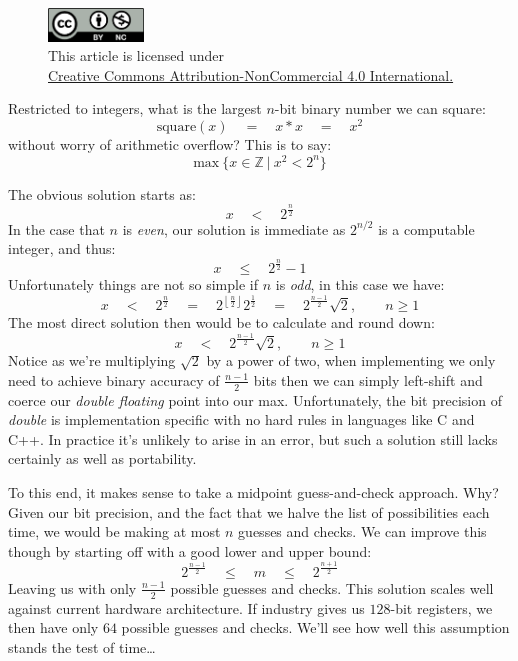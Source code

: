 \documentclass[twoside]{article}
\newcommand{\eq}{\ensuremath{\quad = \quad}}
\newcommand{\lt}{\ensuremath{\quad < \quad}}
\renewcommand{\leq}{\ensuremath{\quad\le\quad}}
\begin{document}
\begin{figure}[h]
\centering
\includegraphics[width=1in]{../../../cc-by-nc.png}\\[0.1in]
\tiny This article is licensed under \\
\href{http://creativecommons.org/licenses/by-nc/4.0/}
{Creative Commons Attribution-NonCommercial 4.0 International.}\\[0.3in]
\end{figure}

Restricted to integers, what is the largest $ n $-bit binary number we can square:
$$ \mbox{square}(x)\quad =\quad x*x\quad =\quad x^2 $$
without worry of arithmetic overflow? This is to say:
$$ \mbox{max}\ \{ x\in\mathbb{Z}\ |\ x^2 < 2^n \} $$

The obvious solution starts as:
$$ x \lt 2^{\frac{n}{2}} $$
In the case that $ n $ is \emph{even}, our solution is immediate as $ 2^{n/2} $ is a computable integer, and thus:
$$ x \leq 2^{\frac{n}{2}}-1 $$
Unfortunately things are not so simple if $ n $ is \emph{odd}, in this case we have:
$$ x\lt 2^\frac{n}{2} \eq 2^{\left\lfloor\frac{n}{2}\right\rfloor}2^\frac{1}{2} \eq 2^\frac{n-1}{2}\sqrt{2},\qquad n\ge 1 $$
The most direct solution then would be to calculate and round down:
$$ x\lt 2^\frac{n-1}{2}\sqrt{2},\qquad n\ge 1 $$
Notice as we're multiplying $ \sqrt{2} $ by a power of two, when implementing we only need to achieve binary accuracy
of $ \frac{n-1}{2} $ bits then we can simply left-shift and coerce our \emph{double floating} point into our max.
Unfortunately, the bit precision of \emph{double} is implementation specific with no hard rules in languages like C and C++.
In practice it's unlikely to arise in an error, but such a solution still lacks certainly as well as portability.

To this end, it makes sense to take a midpoint guess-and-check approach. Why? Given our bit precision, and the fact that
we halve the list of possibilities each time, we would be making at most $ n $ guesses and checks. We can improve this
though by starting off with a good lower and upper bound:
$$ 2^\frac{n-1}{2} \leq m \leq 2^\frac{n+1}{2} $$
Leaving us with only $ \frac{n-1}{2} $ possible guesses and checks. This solution scales well against current hardware
architecture. If industry gives us $ 128 $-bit registers, we then have only $ 64 $ possible guesses and checks.
We'll see how well this assumption stands the test of time\ldots
\end{document}
